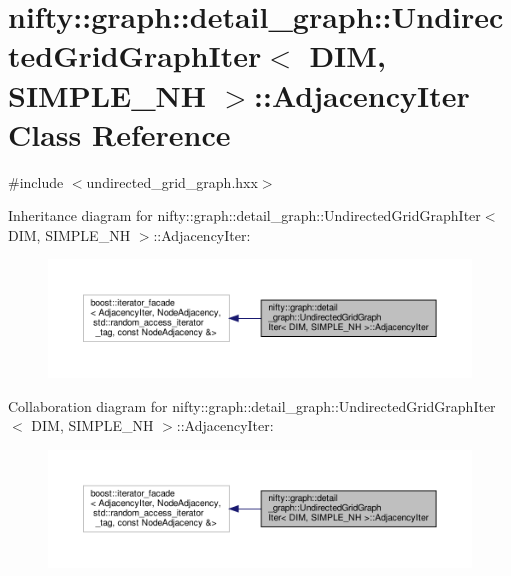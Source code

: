 \hypertarget{classnifty_1_1graph_1_1detail__graph_1_1UndirectedGridGraphIter_1_1AdjacencyIter}{}\section{nifty\+:\+:graph\+:\+:detail\+\_\+graph\+:\+:Undirected\+Grid\+Graph\+Iter$<$ D\+IM, S\+I\+M\+P\+L\+E\+\_\+\+NH $>$\+:\+:Adjacency\+Iter Class Reference}
\label{classnifty_1_1graph_1_1detail__graph_1_1UndirectedGridGraphIter_1_1AdjacencyIter}


{\ttfamily \#include $<$undirected\+\_\+grid\+\_\+graph.\+hxx$>$}



Inheritance diagram for nifty\+:\+:graph\+:\+:detail\+\_\+graph\+:\+:Undirected\+Grid\+Graph\+Iter$<$ D\+IM, S\+I\+M\+P\+L\+E\+\_\+\+NH $>$\+:\+:Adjacency\+Iter\+:
\nopagebreak
\begin{figure}[H]
\begin{center}
\leavevmode
\includegraphics[width=350pt]{classnifty_1_1graph_1_1detail__graph_1_1UndirectedGridGraphIter_1_1AdjacencyIter__inherit__graph}
\end{center}
\end{figure}


Collaboration diagram for nifty\+:\+:graph\+:\+:detail\+\_\+graph\+:\+:Undirected\+Grid\+Graph\+Iter$<$ D\+IM, S\+I\+M\+P\+L\+E\+\_\+\+NH $>$\+:\+:Adjacency\+Iter\+:
\nopagebreak
\begin{figure}[H]
\begin{center}
\leavevmode
\includegraphics[width=350pt]{classnifty_1_1graph_1_1detail__graph_1_1UndirectedGridGraphIter_1_1AdjacencyIter__coll__graph}
\end{center}
\end{figure}
